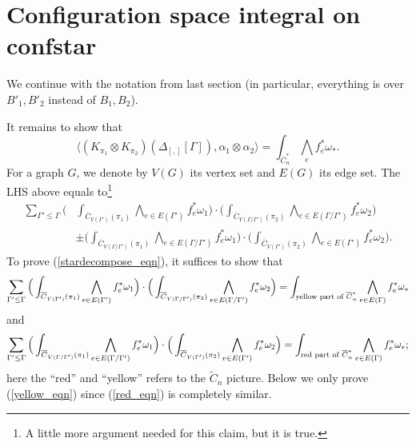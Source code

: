 \documentclass[11pt]{article}
\theoremstyle{definition}
\theoremstyle{remark}
\def\wt#1{\widetilde{#1}}
\def\ov#1{\overline{#1}}
\def\tn#1{\textnormal{#1}}
\begin{document}
\section{Configuration space integral on confstar}

We continue with the notation from last section (in particular, everything is over $B'_1, B'_2$ instead of $B_1, B_2$). 

It remains to show that 
\begin{equation}\label{stardecompose_eqn}
\big\langle (K_{\pi_1}\otimes K_{\pi_2})(\Delta_{[,]}[\Gamma]), \alpha_1\otimes\alpha_2 \big\rangle=
\int_{\ov{C}^*_n}\bigwedge_{e}f_e^*{\omega_*}. 
\end{equation}
For a graph $G$, we denote by $V(G)$ its vertex set and $E(G)$ its edge set. 
The LHS above equals to\footnote{
A little more argument needed for this claim, but it is true.} 
\begin{align*}
\sum_{\Gamma'\le\Gamma}
\Big(&\int_{\ov{C}_{V(\Gamma')}(\pi_1)}
\bigwedge_{e\in E(\Gamma')}f_e^*\omega_1\Big)
\cdot
\Big(\int_{\ov{C}_{V(\Gamma/\Gamma')}(\pi_2)}
\bigwedge_{e\in E(\Gamma/\Gamma')}f_e^*\omega_2\Big)\\
&\pm
\Big(\int_{\ov{C}_{V(\Gamma/\Gamma')}(\pi_1)}
\bigwedge_{e\in E(\Gamma/\Gamma')}f_e^*\omega_1\Big)
\cdot
\Big(\int_{\ov{C}_{V(\Gamma')}(\pi_2)}
\bigwedge_{e\in E(\Gamma')}f_e^*\omega_2\Big).
\end{align*}
To prove (\ref{stardecompose_eqn}), it suffices to show that 
\begin{equation}\label{yellow_eqn}
\sum_{\Gamma'\le\Gamma}
\Big(\int_{\ov{C}_{V(\Gamma')}(\pi_1)}
\bigwedge_{e\in E(\Gamma')}f_e^*\omega_1\Big)
\cdot
\Big(\int_{\ov{C}_{V(\Gamma/\Gamma')}(\pi_2)}
\bigwedge_{e\in E(\Gamma/\Gamma')}f_e^*\omega_2\Big)=
\int_{\tn{yellow part of }\ov{C}^*_n}\bigwedge_{e\in E(\Gamma)}f_e^*{\omega_*}
\end{equation}
and 
\begin{equation}\label{red_eqn}
\sum_{\Gamma'\le\Gamma}
\Big(\int_{\ov{C}_{V(\Gamma/\Gamma')}(\pi_1)}
\bigwedge_{e\in E(\Gamma/\Gamma')}f_e^*\omega_1\Big)
\cdot
\Big(\int_{\ov{C}_{V(\Gamma')}(\pi_2)}
\bigwedge_{e\in E(\Gamma')}f_e^*\omega_2\Big)=
\int_{\tn{red part of }\ov{C}^*_n}\bigwedge_{e\in E(\Gamma)}f_e^*{\omega_*};
\end{equation}
here the ``red'' and ``yellow'' refers to the $\wt{C}_n$ picture. 
Below we only prove (\ref{yellow_eqn}) since (\ref{red_eqn}) is completely similar. 
\end{document}

